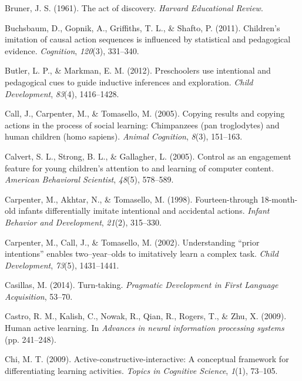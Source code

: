\documentclass[english,floatsintext,man]{apa6}
\theoremstyle{definition}
\theoremstyle{definition}
\theoremstyle{definition}
\theoremstyle{remark}
\begin{document}
\hypertarget{ref-bruner1961act}{}
Bruner, J. S. (1961). The act of discovery. \emph{Harvard Educational
Review}.

\hypertarget{ref-buchsbaum2011children}{}
Buchsbaum, D., Gopnik, A., Griffiths, T. L., \& Shafto, P. (2011).
Children's imitation of causal action sequences is influenced by
statistical and pedagogical evidence. \emph{Cognition}, \emph{120}(3),
331--340.

\hypertarget{ref-butler2012preschoolers}{}
Butler, L. P., \& Markman, E. M. (2012). Preschoolers use intentional
and pedagogical cues to guide inductive inferences and exploration.
\emph{Child Development}, \emph{83}(4), 1416--1428.

\hypertarget{ref-call2005copying}{}
Call, J., Carpenter, M., \& Tomasello, M. (2005). Copying results and
copying actions in the process of social learning: Chimpanzees (pan
troglodytes) and human children (homo sapiens). \emph{Animal Cognition},
\emph{8}(3), 151--163.

\hypertarget{ref-calvert2005control}{}
Calvert, S. L., Strong, B. L., \& Gallagher, L. (2005). Control as an
engagement feature for young children's attention to and learning of
computer content. \emph{American Behavioral Scientist}, \emph{48}(5),
578--589.

\hypertarget{ref-carpenter1998fourteen}{}
Carpenter, M., Akhtar, N., \& Tomasello, M. (1998). Fourteen-through
18-month-old infants differentially imitate intentional and accidental
actions. \emph{Infant Behavior and Development}, \emph{21}(2), 315--330.

\hypertarget{ref-carpenter2002understanding}{}
Carpenter, M., Call, J., \& Tomasello, M. (2002). Understanding ``prior
intentions'' enables two--year--olds to imitatively learn a complex
task. \emph{Child Development}, \emph{73}(5), 1431--1441.

\hypertarget{ref-casillas2014turn}{}
Casillas, M. (2014). Turn-taking. \emph{Pragmatic Development in First
Language Acquisition}, 53--70.

\hypertarget{ref-castro2009human}{}
Castro, R. M., Kalish, C., Nowak, R., Qian, R., Rogers, T., \& Zhu, X.
(2009). Human active learning. In \emph{Advances in neural information
processing systems} (pp. 241--248).

\hypertarget{ref-chi2009active}{}
Chi, M. T. (2009). Active-constructive-interactive: A conceptual
framework for differentiating learning activities. \emph{Topics in
Cognitive Science}, \emph{1}(1), 73--105.
\end{document}
